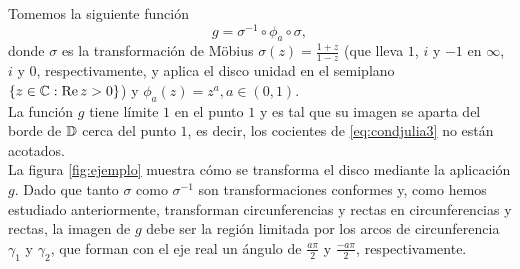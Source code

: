 \begin{example}
    \label{ex:jul2}
    Tomemos la siguiente función
    \begin{equation*}
        g = \sigma^{-1} \circ \phi_a \circ \sigma,
    \end{equation*}
    donde $\sigma$ es la transformación de Möbius $\sigma(z) = \frac{1+z}{1-z}$ (que lleva $1$, $i$ y $-1$ en $\infty$, $i$ y $0$, respectivamente, y aplica el disco unidad en el semiplano $\{z \in \mathbb{C} : \operatorname{Re} z > 0\}$) y $\phi_a(z) = z^a, a \in (0,1)$. \\

    La función $g$ tiene límite $1$ en el punto $1$ y es tal que su imagen se aparta del borde de $\mathbb{D}$ cerca del punto $1$, es decir, los cocientes de \ref{eq:condjulia3} no están acotados. \\

    La figura \ref{fig:ejemplo} muestra cómo se transforma el disco mediante la aplicación $g$. Dado que tanto $\sigma$ como $\sigma^{-1}$ son transformaciones conformes y, como hemos estudiado anteriormente, transforman circunferencias y rectas en circunferencias y rectas, la imagen de $g$ debe ser la región limitada por los arcos de circunferencia $\gamma_1$ y $\gamma_2$, que forman con el eje real un ángulo de $\frac{a \pi}{2}$ y $\frac{-a \pi}{2}$, respectivamente. \\

    \begin{figure}[!htbp]
        \centering
\end{figure}
\end{example}
